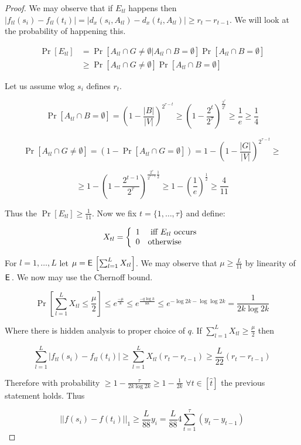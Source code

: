 \begin{proof}
	We may observe that if $E_{tl}$ happens then $|f_{tl}(s_{i}) - f_{tl}(t_{i})| = |d_{x}(s_{i}, A_{tl}) - d_{x}(t_{i}, A_{tl})| \geq r_{t} - r_{t -1}$. We will look at the  probability of happening this.
	
	$$
	\begin{aligned}
		\Pr[E_{tl}] & = \Pr[A_{tl} \cap G \neq \emptyset | A_{tl} \cap B = \emptyset] \Pr[A_{tl} \cap B = \emptyset] \\
		            & \geq \Pr[A_{tl} \cap G \neq \emptyset] \Pr[A_{tl} \cap B = \emptyset]
	\end{aligned}
	$$
	
	Let us assume wlog $s_{i}$ defines $r_{t}$.
	
	$$
	\Pr[A_{tl} \cap B = \emptyset] = \left( 1 - \frac{|B|}{|V|} \right) ^{2^{\tau - t}} \geq \left( 1 - \frac{2^{t}}{2^{\tau}} \right) ^{\frac{2^{\tau}}{2^{t}}} \geq \frac{1}{e} \geq \frac{1}{4}
	$$
	
	$$
	\Pr[A_{tl} \cap G \neq \emptyset] = (1 - \Pr[A_{tl} \cap G = \emptyset]) = 1 - \left( 1 - \frac{|G|}{|V|} \right)^{2^{\tau - t}} \geq
	$$
	
	$$
	\geq 1 - \left( 1 - \frac{2^{t -1}}{2^{\tau}} \right)^{\frac{2^{\tau}}{2^{t-1}} \frac{1}{2}} \geq 1 - \left( \frac{1}{e} \right)^{\frac{1}{2}} \geq \frac{4}{11}
	$$
	
	Thus the $\Pr[E_{tl}] \geq \frac{1}{11}$. Now we fix $t = \{1, \dots, \tau\}$ and define:
	
	$$
	X_{tl} = \left\{
	\begin{array}{l l}
		1 & \text{ iff } E_{tl} \text{ occurs} \\
		0 & \text{otherwise}
	\end{array}
	\right.
	$$
	
	For $l = 1, \dots, L$ let $\mu = \operatorname{\textsf{E}\,} \left[ \sum_{l = 1}^{L} X_{tl} \right]$. We may observe that $\mu \geq \frac{L}{11}$ by linearity of $\operatorname{\textsf{E}\,}$. We now may use the Chernoff bound.
	
	$$
	\Pr \left[ \sum_{l = 1}^{L} X_{tl} \leq \frac{\mu}{2} \right] \leq e^{\frac{-\mu}{8}} \leq e^{\frac{-q \log k}{88}} \leq e^{-\log 2k - \log\log2k} = \frac{1}{2k \log 2k}
	$$
	
	Where there is hidden analysis to proper choice of $q$. If $\sum_{l = 1}^{L} X_{tl} \geq \frac{\mu}{2}$ then
	
	$$
	\sum_{l = 1}^{L} |f_{tl}(s_{i}) - f_{tl}(t_{i})| \geq \sum_{l = 1}^{L} X_{tl} (r_{t} - r_{t-1}) \geq \frac{L}{22} (r_{t} - r_{t-1})
	$$
	
	Therefore with probability $\geq 1 - \frac{\tau}{2k \log 2k} \geq 1 - \frac{1}{2k}$ $\forall t \in [\hat{t}]$ the previous statement holds. Thus
	
	$$
	||f(s_{i}) - f(t_{i})||_{1} \geq \frac{L}{88} y_{i} = \frac{L}{88} 4 \sum_{t = 1}^{\tau} (y_{t} - y_{t-1})
	$$
\end{proof}

